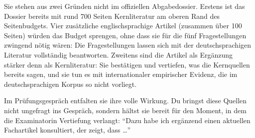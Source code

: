 \documentclass[ngerman, a4paper]{article}
\begin{document}
Sie stehen aus zwei Gründen nicht im offiziellen Abgabedossier. Erstens ist das Dossier
bereits mit rund 700 Seiten Kernliteratur am oberen Rand des Seitenbudgets. Vier
zusätzliche englischsprachige Artikel (zusammen über 100 Seiten) würden das Budget
sprengen, ohne dass sie für die fünf Fragestellungen zwingend nötig wären: Die
Fragestellungen lassen sich mit der deutschsprachigen Literatur vollständig beantworten.
Zweitens sind die Artikel als Ergänzung stärker denn als Kernliteratur: Sie bestätigen und
vertiefen, was die Kernquellen bereits sagen, und sie tun es mit internationaler empirischer
Evidenz, die im deutschsprachigen Korpus so nicht vorliegt.

Im Prüfungsgespräch entfalten sie ihre volle Wirkung. Du bringst diese Quellen nicht
ungefragt ins Gespräch, sondern hältst sie bereit für den Moment, in dem die Examinatorin
Vertiefung verlangt: \enquote{Dazu habe ich ergänzend einen aktuellen Fachartikel
konsultiert, der zeigt, dass \ldots}
\end{document}
